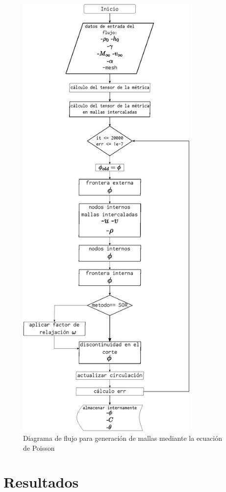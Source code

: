 \documentclass[letterpaper, openright, 12pt]{book}
\begin{document}
    \begin{figure}[htbp!]
        \centering
        \includegraphics[keepaspectratio, width=90mm]{./Imagenes/flujo_potencial_funcion}
        \caption{Diagrama de flujo para generación de mallas mediante la
            ecuación de Poisson}
        \label{flujo_potencial_funcion}
    \end{figure}
%
%
%
%
%

%
%
%
%
%
\chapter{Resultados}
\end{document}
